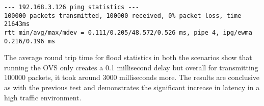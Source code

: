 \begin{lstlisting}[caption={Ping Flood With OVS}, label={pingflood_ovs}]
--- 192.168.3.126 ping statistics ---
100000 packets transmitted, 100000 received, 0% packet loss, time 21643ms
rtt min/avg/max/mdev = 0.111/0.205/48.572/0.526 ms, pipe 4, ipg/ewma 0.216/0.196 ms
\end{lstlisting}

The average round trip time for flood statistics in both the scenarios show that running the OVS only creates a 0.1 millisecond delay but overall for transmitting 100000 packets, it took around 3000 milliseconds more. The results are conclusive as with the previous test and demonstrates the significant increase in latency in a high traffic environment.
